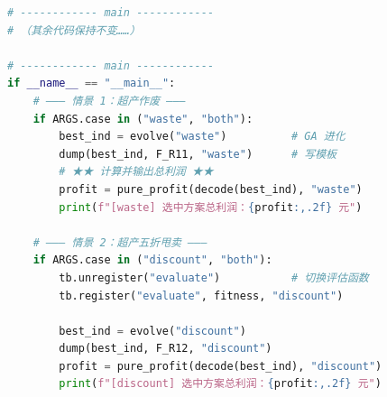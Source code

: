 \begin{lstlisting}[language=Python, keywordstyle=\color{blue!70}, commentstyle=\color{red!50!green!50!blue!50}, frame=shadowbox, rulesepcolor=\color{red!20!green!20!blue!20}]
# ------------ main ------------
# （其余代码保持不变……）

# ------------ main ------------
if __name__ == "__main__":
    # ——— 情景 1：超产作废 ———
    if ARGS.case in ("waste", "both"):
        best_ind = evolve("waste")          # GA 进化
        dump(best_ind, F_R11, "waste")      # 写模板
        # ★★ 计算并输出总利润 ★★
        profit = pure_profit(decode(best_ind), "waste")
        print(f"[waste] 选中方案总利润：{profit:,.2f} 元")

    # ——— 情景 2：超产五折甩卖 ———
    if ARGS.case in ("discount", "both"):
        tb.unregister("evaluate")           # 切换评估函数
        tb.register("evaluate", fitness, "discount")

        best_ind = evolve("discount")
        dump(best_ind, F_R12, "discount")
        profit = pure_profit(decode(best_ind), "discount")
        print(f"[discount] 选中方案总利润：{profit:,.2f} 元")


\end{lstlisting}